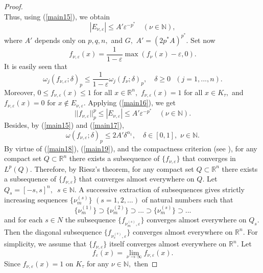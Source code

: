 \documentclass[12pt,twoside,reqno]{amsart}
\numberwithin{equation}{section}
\theoremstyle{definition}
\numberwithin{equation}{section}
\begin{document}
\begin{proof}
$$$$
Thus, using (\ref{main15}), we obtain
\begin{equation}\label{main16}
|E_{\nu,{\varepsilon}}|\le A'{\varepsilon}^{-p^*} \quad (\nu\in {\mathbb{N}}),
\end{equation}
where  $A'$ depends only on $p,q,n,$ and $G,$ $A'=(2p^*A)^{p^*}.$  Set now
$$
f_{\nu,{\varepsilon}}(x)=\frac1{1-{\varepsilon}}\max (f_\nu(x)-{\varepsilon}, 0).
$$
It is easily seen that
\begin{equation}\label{main17}
{\omega}_j(f_{\nu,{\varepsilon}};{\delta})_p\le \frac1{1-{\varepsilon}}{\omega}_j(f_\nu;{\delta})_p, \quad {\delta}\ge 0\,\,\,\,(j=1,...,n).
\end{equation}
Moreover, $0\le f_{\nu,{\varepsilon}}(x)\le 1$ for all $x\in{\mathbb{R}}^n,$
$f_{\nu,{\varepsilon}}(x)=1$ for all $x\in K_\tau,$ and $f_{\nu,{\varepsilon}}(x)=0$ for
$x\not\in E_{\nu,{\varepsilon}}.$ Applying (\ref{main16}), we get
\begin{equation}\label{main18}
||f_{\nu,{\varepsilon}}||_p^p\le |E_{\nu,{\varepsilon}}| \le A'{\varepsilon}^{-p^*} \quad (\nu\in {\mathbb{N}}).
\end{equation}
Besides, by (\ref{main15}) and (\ref{main17}),
\begin{equation}\label{main19}
{\omega}(f_{\nu,{\varepsilon}};{\delta})_p\le 2A'{\delta}^{{\alpha}_1}, \quad {\delta}\in [0,1], \,\,\nu\in {\mathbb{N}}.
\end{equation}
By virtue of (\ref{main18}), (\ref{main19}), and the compactness
criterion (see \cite[p. 111]{Br2}), for any compact set $Q\subset{\mathbb{R}}^n$ there exists a subsequence of
$\{f_{\nu,{\varepsilon}}\}$ that converges in $L^p(Q).$ Therefore, by Riesz's theorem, for any compact set $Q\subset{\mathbb{R}}^n$ there exists a subsequence of
$\{f_{\nu,{\varepsilon}}\}$ that converges almost everywhere on $Q$. Let $Q_s=[-s,s]^n, \,\,\, s\in {\mathbb{N}}.$ A successive extraction of  subsequences gives strictly increasing sequences $\{\nu_m^{(s)}\}$ $(s=1,2,...)$
of natural numbers such that
$$
\{\nu_m^{(1)}\}\supset \{\nu_m^{(2)}\}\supset ... \supset \{\nu_m^{(s)}\}\supset ...
$$
and for each $s\in N$ the subsequence $\{f_{\nu_m^{(s)},{\varepsilon}}\}$ converges almost everywhere on $Q_s.$
Then the diagonal subsequence $\{f_{\nu_s^{(s)},{\varepsilon}}\}$ converges almost everywhere on ${\mathbb{R}}^n.$ For simplicity, we  assume that $\{f_{\nu,{\varepsilon}}\}$ itself
converges almost everywhere on ${\mathbb{R}}^n.$ Let
$$
f_{\varepsilon}(x)=\lim_{\nu\to \infty} f_{\nu,{\varepsilon}}(x).
$$
 Since $f_{\nu,{\varepsilon}}(x)=1$ on $K_\tau$  for any $\nu\in {\mathbb{N}},$ then

\end{proof}
\end{document}
